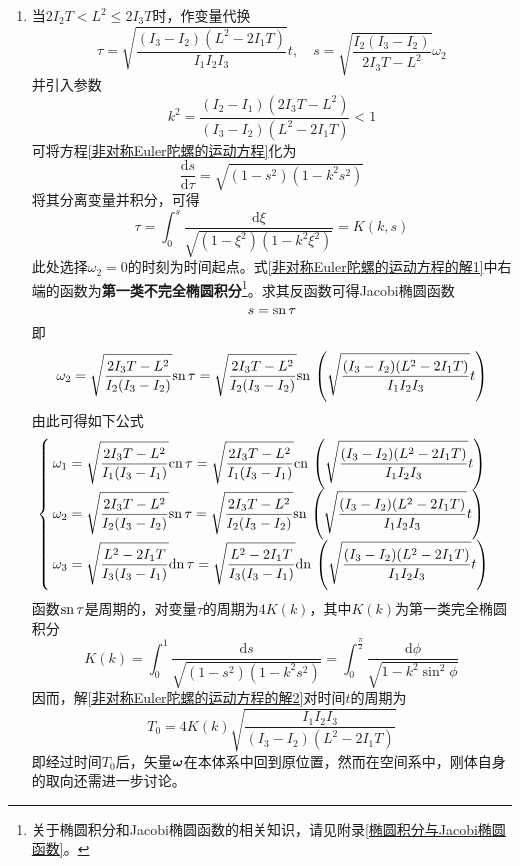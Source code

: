 \begin{enumerate}
\item 当$2I_2T<L^2\leqslant 2I_3T$时，作变量代换
\begin{equation}
	\tau = \sqrt{\frac{(I_3-I_2)(L^2-2I_1T)}{I_1I_2I_3}}t,\quad s = \sqrt{\frac{I_2(I_3-I_2)}{2I_3T-L^2}}\omega_2
\end{equation}
并引入参数
\begin{equation}
	k^2 = \frac{(I_2-I_1)(2I_3T-L^2)}{(I_3-I_2)(L^2-2I_1T)}<1
\end{equation}
可将方程\eqref{非对称Euler陀螺的运动方程}化为
\begin{equation*}
	\frac{\mathrm{d}s}{\mathrm{d}\tau} = \sqrt{(1-s^2)(1-k^2s^2)}
\end{equation*}
将其分离变量并积分，可得
\begin{equation}
	\tau = \int_0^s \frac{\mathrm{d}\xi}{\sqrt{(1-\xi^2)(1-k^2\xi^2)}} = K(k,s)
	\label{非对称Euler陀螺的运动方程的解1}
\end{equation}
此处选择$\omega_2=0$的时刻为时间起点。式\eqref{非对称Euler陀螺的运动方程的解1}中右端的函数为{\bf 第一类不完全椭圆积分}\footnote{关于椭圆积分和Jacobi椭圆函数的相关知识，请见附录\ref{椭圆积分与Jacobi椭圆函数}。}。求其反函数可得Jacobi椭圆函数
\begin{equation*}
	s = \mathrm{sn}\, \tau
\end{equation*}
即
\begin{equation}
	\omega_2 = \sqrt{\frac{2I_3T-L^2}{I_2(I_3-I_2)}}\mathrm{sn}\, \tau = \sqrt{\frac{2I_3T-L^2}{I_2(I_3-I_2)}}\mathrm{sn}\, \left(\sqrt{\frac{(I_3-I_2)(L^2-2I_1T)}{I_1I_2I_3}}t\right)
\end{equation}
由此可得如下公式
\begin{equation}
\begin{cases}
	\displaystyle \omega_1 = \sqrt{\frac{2I_3T-L^2}{I_1(I_3-I_1)}}\mathrm{cn}\, \tau = \sqrt{\frac{2I_3T-L^2}{I_1(I_3-I_1)}}\mathrm{cn}\, \left(\sqrt{\frac{(I_3-I_2)(L^2-2I_1T)}{I_1I_2I_3}}t\right) \\
	\displaystyle \omega_2 = \sqrt{\frac{2I_3T-L^2}{I_2(I_3-I_2)}}\mathrm{sn}\, \tau = \sqrt{\frac{2I_3T-L^2}{I_2(I_3-I_2)}}\mathrm{sn}\, \left(\sqrt{\frac{(I_3-I_2)(L^2-2I_1T)}{I_1I_2I_3}}t\right) \\
	\displaystyle \omega_3 = \sqrt{\frac{L^2-2I_1T}{I_3(I_3-I_1)}}\mathrm{dn}\, \tau = \sqrt{\frac{L^2-2I_1T}{I_3(I_3-I_1)}}\mathrm{dn}\, \left(\sqrt{\frac{(I_3-I_2)(L^2-2I_1T)}{I_1I_2I_3}}t\right)
\end{cases}
\label{非对称Euler陀螺的运动方程的解2}
\end{equation}
函数$\mathrm{sn}\, \tau$是周期的，对变量$\tau$的周期为$4K(k)$，其中$K(k)$为第一类完全椭圆积分
\begin{equation*}
	K(k) = \int_0^1 \frac{\mathrm{d}s}{\sqrt{(1-s^2)(1-k^2s^2)}} = \int_0^{\frac{\pi}{2}} \frac{\mathrm{d}\phi}{\sqrt{1-k^2\sin^2\phi}}
\end{equation*}
因而，解\eqref{非对称Euler陀螺的运动方程的解2}对时间$t$的周期为
\begin{equation}
	T_0 = 4K(k)\sqrt{\frac{I_1I_2I_3}{(I_3-I_2)(L^2-2I_1T)}}
	\label{chapter6:非对称Euler陀螺的运动方程解的周期}
\end{equation}
即经过时间$T_0$后，矢量$\boldsymbol{\omega}$在本体系中回到原位置，然而在空间系中，刚体自身的取向还需进一步讨论。


\end{enumerate}
